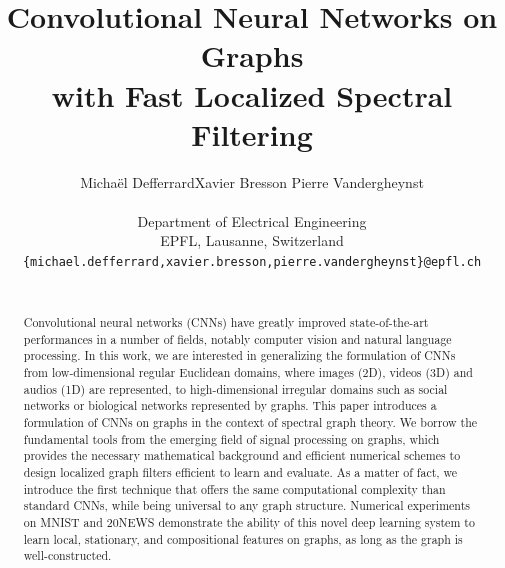 \documentclass{article}
\title{Convolutional Neural Networks on Graphs\\
with Fast Localized Spectral Filtering\\}
\author{
  Micha\"{e}l Defferrard\hspace{1cm}Xavier Bresson\hspace{1cm} Pierre Vandergheynst\\ \\
  Department of Electrical Engineering \\
  EPFL, Lausanne, Switzerland \\
  {\small \texttt{\{michael.defferrard,xavier.bresson,pierre.vandergheynst\}@epfl.ch} } \\\\
}
\begin{document}
\maketitle



\begin{abstract}


Convolutional neural networks (CNNs) have greatly improved state-of-the-art performances in a number of fields, notably computer vision and natural language processing. In this work, we are interested in generalizing the formulation of CNNs from low-dimensional regular Euclidean domains, where images (2D), videos (3D) and audios (1D) are represented, to high-dimensional irregular domains such as social networks or biological networks represented by graphs. This paper introduces a formulation of CNNs on graphs in the context of spectral graph theory. We borrow the fundamental tools from the emerging field of signal processing on graphs, which provides the necessary mathematical background and efficient numerical schemes to design localized graph filters efficient to learn and evaluate.  As a matter of fact, we introduce the first technique that offers the same computational complexity than standard CNNs, while being universal to any graph structure. Numerical experiments on MNIST and 20NEWS demonstrate the ability of this novel deep learning system to learn local, stationary, and compositional features on graphs, as long as the graph is well-constructed. 	
	
	 



	
\end{abstract}

\end{document}
